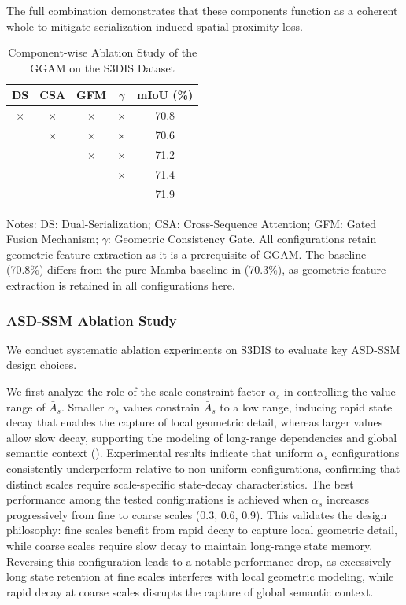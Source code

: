 \documentclass[a4paper,fleqn]{cas-sc}
\begin{document}
The full combination demonstrates that these components function as a coherent whole to mitigate serialization-induced spatial proximity loss.

\begin{table}[!t]
	\centering
	\caption{Component-wise Ablation Study of the GGAM on the S3DIS Dataset}
	\label{tab:ggam_components}
	\begin{tabular}{ccccc}
		\toprule
		\textbf{DS} & \textbf{CSA} & \textbf{GFM} & \textbf{$\gamma$} & \textbf{mIoU (\%)} \\
		\midrule
		$\times$ & $\times$ & $\times$ & $\times$ & 70.8 \\
		\checkmark & $\times$ & $\times$ & $\times$ & 70.6 \\
		\checkmark & \checkmark & $\times$ & $\times$ & 71.2 \\
		\checkmark & \checkmark & \checkmark & $\times$ & 71.4 \\
		\checkmark & \checkmark & \checkmark & \checkmark & 71.9 \\
		\bottomrule
	\end{tabular}
	\par\vspace{3pt}
	\footnotesize Notes: DS: Dual-Serialization; CSA: Cross-Sequence Attention; GFM: Gated Fusion Mechanism; $\gamma$: Geometric Consistency Gate. All configurations retain geometric feature extraction as it is a prerequisite of GGAM. The baseline (70.8\%) differs from the pure Mamba baseline in  (70.3\%), as geometric feature extraction is retained in all configurations here.
\end{table}

\subsubsection{ASD-SSM Ablation Study}

We conduct systematic ablation experiments on S3DIS to evaluate key ASD-SSM design choices.

We first analyze the role of the scale constraint factor $\alpha_s$ in controlling the value range of $\bar{A}_s$. Smaller $\alpha_s$ values constrain $\bar{A}_s$ to a low range, inducing rapid state decay that enables the capture of local geometric detail, whereas larger values allow slow decay, supporting the modeling of long-range dependencies and global semantic context ().
Experimental results indicate that uniform $\alpha_s$ configurations consistently underperform relative to non-uniform configurations, confirming that distinct scales require scale-specific state-decay characteristics. The best performance among the tested configurations is achieved when $\alpha_s$ increases progressively from fine to coarse scales (0.3, 0.6, 0.9). This validates the design philosophy: fine scales benefit from rapid decay to capture local geometric detail, while coarse scales require slow decay to maintain long-range state memory. Reversing this configuration leads to a notable performance drop, as excessively long state retention at fine scales interferes with local geometric modeling, while rapid decay at coarse scales disrupts the capture of global semantic context.
\end{document}
